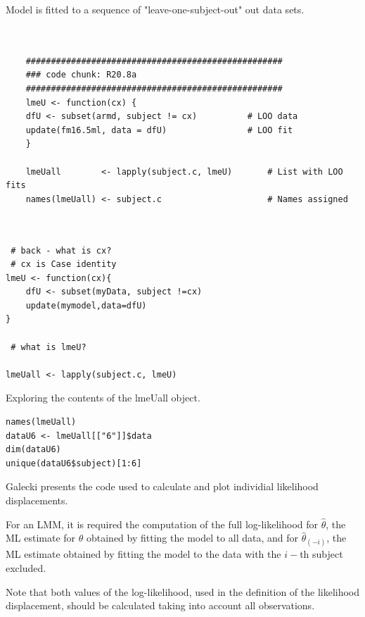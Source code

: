 \documentclass[a4paper,12pt]{article}
\begin{document}
Model is fitted to a sequence of "leave-one-subject-out" out data sets.


\begin{framed}
	\begin{verbatim}	
	
	
	###################################################
	### code chunk: R20.8a
	###################################################
	lmeU <- function(cx) { 
	dfU <- subset(armd, subject != cx)          # LOO data 
	update(fm16.5ml, data = dfU)                # LOO fit 
	}
	
	lmeUall        <- lapply(subject.c, lmeU)       # List with LOO fits
	names(lmeUall) <- subject.c                     # Names assigned          
	
	\end{verbatim}
\end{framed}

\begin{framed}
\begin{verbatim}

 # back - what is cx?
 # cx is Case identity
lmeU <- function(cx){
	dfU <- subset(myData, subject !=cx)
	update(mymodel,data=dfU)
}

 # what is lmeU?

lmeUall <- lapply(subject.c, lmeU)
\end{verbatim}
\end{framed}
Exploring the contents of the lmeUall object.
\begin{framed}
\begin{verbatim}
names(lmeUall)
dataU6 <- lmeUall[["6"]]$data
dim(dataU6)
unique(dataU6$subject)[1:6]
\end{verbatim}
\end{framed}


Galecki presents the code used to calculate and plot individial likelihood displacements.

For an LMM, it is required the computation of the full log-likelihood for \textbf{$\hat{\theta}$}, the ML estimate for 
\textbf{$\theta$} obtained by fitting the model to all data, and for \textbf{$\hat{\theta}_(-i)$}, the ML estimate obtained
by fitting the model to the data with the $i-$th subject excluded.

Note that both values of the log-likelihood, used in the definition of the likelihood displacement, should be 
calculated taking into account all observations.
\end{document}
